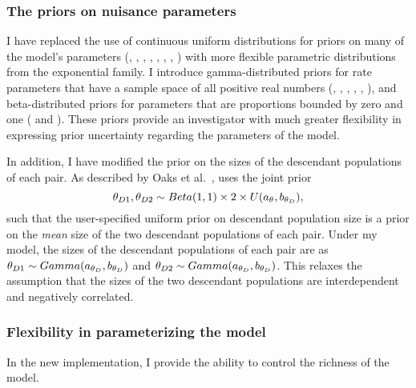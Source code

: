 \subsubsection{The priors on nuisance parameters}
I have replaced the use of continuous uniform distributions for priors on many
of the model's parameters (\divTime{}, \ancestralTheta{},
, , ,
, \recombinationRate, \migrationRate{}) with more flexible
parametric distributions from the exponential family.
I introduce gamma-distributed priors for rate parameters that have a sample
space of all positive real numbers (\divTime{}, \ancestralTheta{},
, , \recombinationRate,
\migrationRate{}), and beta-distributed priors for parameters that are
proportions bounded by zero and one ( and
).
These priors provide an investigator with much greater flexibility in
expressing prior uncertainty regarding the parameters of the model.

In addition, I have modified the prior on the sizes of the descendant
populations of each pair.
As described by Oaks et al.\ \cite{Oaks2012}, \msb uses the joint prior
\begin{equation}
    \descendantTheta{1}{}, \descendantTheta{2}{} \sim
    Beta(1,1) \times 2 \times U(\uniformMin{\myTheta{}},
    \uniformMax{\descendantTheta{}{}}),
    \label{eq:jointThetaPrior}
\end{equation}
such that the user-specified uniform prior on descendant population
size is a prior on the \emph{mean} size of the two descendant
populations of each pair.
Under my model, the sizes of the descendant populations of each
pair are \iid as
$\descendantTheta{1}{} \sim Gamma(\gammaShape{\descendantTheta{}{}},
\gammaScale{\descendantTheta{}{}})$
and
$\descendantTheta{2}{} \sim Gamma(\gammaShape{\descendantTheta{}{}},
\gammaScale{\descendantTheta{}{}})$.
This relaxes the assumption that the sizes of the two descendant populations
are interdependent and negatively correlated.

\subsubsection{Flexibility in parameterizing the model}
In the new implementation, I provide the ability to control the richness of the
model.

